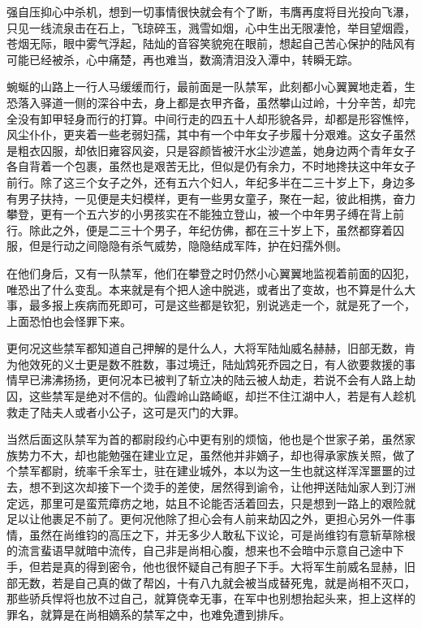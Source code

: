 强自压抑心中杀机，想到一切事情很快就会有个了断，韦膺再度将目光投向飞瀑，只见一线流泉击在石上，飞琼碎玉，溅雪如烟，心中生出无限凄怆，举目望烟霞，苍烟无际，眼中雾气浮起，陆灿的音容笑貌宛在眼前，想起自己苦心保护的陆风有可能已经被杀，心中痛楚，再也难当，数滴清泪没入潭中，转瞬无踪。

蜿蜒的山路上一行人马缓缓而行，最前面是一队禁军，此刻都小心翼翼地走着，生恐落入驿道一侧的深谷中去，身上都是衣甲齐备，虽然攀山过岭，十分辛苦，却完全没有卸甲轻身而行的打算。中间行走的四五十人却形貌各异，却都是形容憔悴，风尘仆仆，更夹着一些老弱妇孺，其中有一个中年女子步履十分艰难。这女子虽然是粗衣囚服，却依旧雍容风姿，只是容颜皆被汗水尘沙遮盖，她身边两个青年女子各自背着一个包裹，虽然也是艰苦无比，但似是仍有余力，不时地搀扶这中年女子前行。除了这三个女子之外，还有五六个妇人，年纪多半在二三十岁上下，身边多有男子扶持，一见便是夫妇模样，更有一些男女童子，聚在一起，彼此相携，奋力攀登，更有一个五六岁的小男孩实在不能独立登山，被一个中年男子缚在背上前行。除此之外，便是二三十个男子，年纪仿佛，都在三十岁上下，虽然都穿着囚服，但是行动之间隐隐有杀气威势，隐隐结成军阵，护在妇孺外侧。

在他们身后，又有一队禁军，他们在攀登之时仍然小心翼翼地监视着前面的囚犯，唯恐出了什么变乱。本来就是有个把人途中脱逃，或者出了变故，也不算是什么大事，最多报上疾病而死即可，可是这些都是钦犯，别说逃走一个，就是死了一个，上面恐怕也会怪罪下来。

更何况这些禁军都知道自己押解的是什么人，大将军陆灿威名赫赫，旧部无数，肯为他效死的义士更是数不胜数，事过境迁，陆灿鸩死乔园之日，有人欲要救援的事情早已沸沸扬扬，更何况本已被判了斩立决的陆云被人劫走，若说不会有人路上劫囚，这些禁军是绝对不信的。仙霞岭山路崎岖，却拦不住江湖中人，若是有人趁机救走了陆夫人或者小公子，这可是灭门的大罪。

当然后面这队禁军为首的都尉段约心中更有别的烦恼，他也是个世家子弟，虽然家族势力不大，却也能勉强在建业立足，虽然他并非嫡子，却也得承家族关照，做了个禁军都尉，统率千余军士，驻在建业城外，本以为这一生也就这样浑浑噩噩的过去，想不到这次却接下一个烫手的差使，居然得到谕令，让他押送陆灿家人到汀洲定远，那里可是蛮荒瘴疠之地，姑且不论能否活着回去，只是想到一路上的艰险就足以让他裹足不前了。更何况他除了担心会有人前来劫囚之外，更担心另外一件事情，虽然在尚维钧的高压之下，并无多少人敢私下议论，可是尚维钧有意斩草除根的流言蜚语早就暗中流传，自己非是尚相心腹，想来也不会暗中示意自己途中下手，但若是真的得到密令，他也很怀疑自己有胆子下手。大将军生前威名显赫，旧部无数，若是自己真的做了帮凶，十有八九就会被当成替死鬼，就是尚相不灭口，那些骄兵悍将也放不过自己，就算侥幸无事，在军中也别想抬起头来，担上这样的罪名，就算是在尚相嫡系的禁军之中，也难免遭到排斥。

